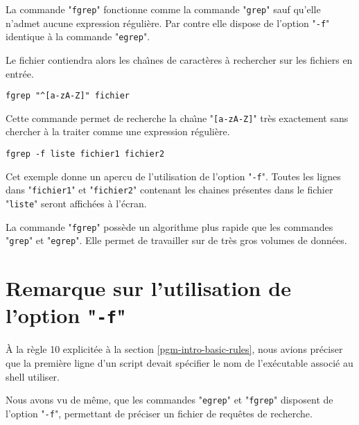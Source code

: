 La
commande "{\tt fgrep}" fonctionne comme la commande "{\tt grep}"
sauf qu'elle n'admet aucune expression r{\'e}guli{\`e}re. Par contre elle dispose
de l'option "{\tt -f}" identique {\`a} la commande "{\tt egrep}". 

Le fichier contiendra alors les cha{\^\i}nes de caract{\`e}res {\`a} rechercher sur
les fichiers en entr{\'e}e.

\begin{example}
\begin{verbatim}
fgrep "^[a-zA-Z]" fichier
\end{verbatim}
Cette commande permet de recherche la cha{\^\i}ne "\verb=[a-zA-Z]="
tr{\`e}s exactement sans chercher {\`a} la traiter comme une expression r{\'e}guli{\`e}re.
\end{example}

\begin{example}
\begin{verbatim}
fgrep -f liste fichier1 fichier2
\end{verbatim}
Cet exemple donne un apercu de l'utilisation de l'option "{\tt -f}".
Toutes les lignes dans "{\tt fichier1}" et "{\tt fichier2}"
contenant les chaines pr{\'e}sentes dans le fichier "{\tt liste}" seront
affich{\'e}es {\`a} l'{\'e}cran.
\end{example}

\begin{remarque}
La commande "{\tt fgrep}" poss{\`e}de un algorithme plus rapide que les
commandes "{\tt grep}" et "{\tt egrep}". Elle permet de travailler
sur de tr{\`e}s gros volumes de donn{\'e}es.
\end{remarque}


\section{\label{adv-filters-f}Remarque sur l'utilisation de l'option "{\tt -f}"}

{\`A} la r{\`e}gle 10 explicit{\'e}e {\`a} la section \ref{pgm-intro-basic-rules}, nous
avions pr{\'e}ciser que la premi{\`e}re ligne d'un script devait sp{\'e}cifier le nom
de l'ex{\'e}cutable associ{\'e} au shell utiliser.

Nous avons vu de m{\^e}me, que les commandes "{\tt egrep}" et "{\tt fgrep}"
disposent de l'option
"{\tt -f}", permettant de pr{\'e}ciser un fichier de requ{\^e}tes de recherche.

